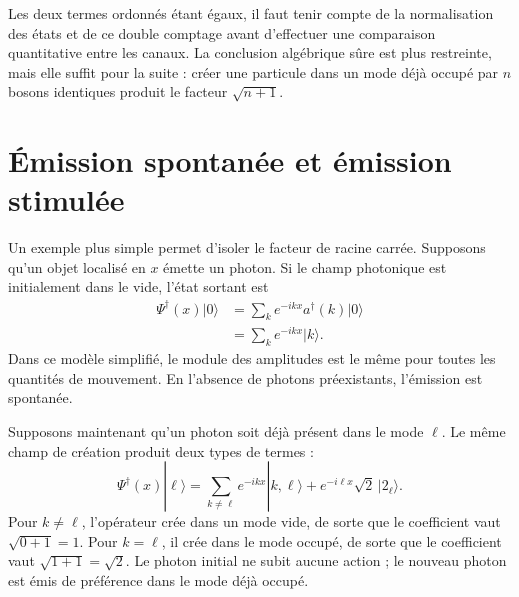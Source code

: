 \begin{classroomqa}
\end{classroomqa}

Les deux termes ordonnés étant égaux, il faut tenir compte de la normalisation des états et de ce double comptage avant d’effectuer une comparaison quantitative entre les canaux. La conclusion algébrique sûre est plus restreinte, mais elle suffit pour la suite : créer une particule dans un mode déjà occupé par \(n\) bosons identiques produit le facteur \(\sqrt{n+1}\).

\section{Émission spontanée et émission stimulée}

Un exemple plus simple permet d’isoler le facteur de racine carrée. Supposons qu’un objet localisé en \(x\) émette un photon. Si le champ photonique est initialement dans le vide, l’état sortant est
\begin{align}
\Psi^\dagger(x)|0\rangle
&=\sum_k e^{-ikx}a^\dagger(k)|0\rangle\\
&=\sum_k e^{-ikx}|k\rangle.
\end{align}
Dans ce modèle simplifié, le module des amplitudes est le même pour toutes les quantités de mouvement. En l’absence de photons préexistants, l’émission est spontanée.

Supposons maintenant qu’un photon soit déjà présent dans le mode \(\ell\). Le même champ de création produit deux types de termes :
\begin{equation}
\Psi^\dagger(x)|\ell\rangle
=
\sum_{k\ne\ell}e^{-ikx}|k,\ell\rangle
+e^{-i\ell x}\sqrt{2}\,|2_\ell\rangle.
\end{equation}
Pour \(k\ne\ell\), l’opérateur crée dans un mode vide, de sorte que le coefficient vaut \(\sqrt{0+1}=1\). Pour \(k=\ell\), il crée dans le mode occupé, de sorte que le coefficient vaut \(\sqrt{1+1}=\sqrt{2}\). Le photon initial ne subit aucune action ; le nouveau photon est émis de préférence dans le mode déjà occupé.

\begin{classroomqa}
\end{classroomqa}

